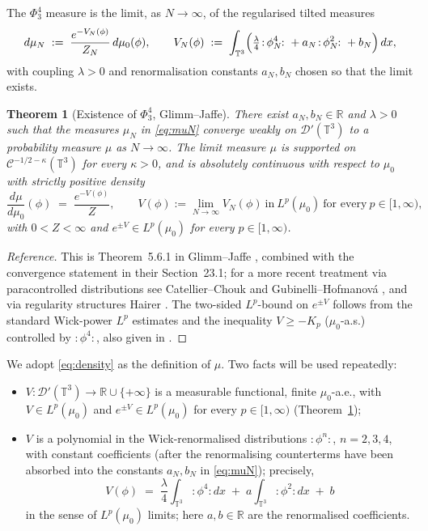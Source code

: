\documentclass[12pt]{article}
\newtheorem{theorem}{Theorem}
\theoremstyle{definition}
\begin{document}
The $\Phi^4_3$ measure is the limit, as $N\to\infty$, of the regularised tilted measures
\begin{equation}\label{eq:muN}
d\mu_N \;:=\; \frac{e^{-V_N(\phi)}}{Z_N}\,d\mu_0(\phi),\qquad
V_N(\phi) \;:=\; \int_{\mathbb{T}^3}\Bigl(\tfrac{\lambda}{4}\colon\!\phi_N^4\!\colon
+ a_N\colon\!\phi_N^2\!\colon + b_N\Bigr)\,dx,
\end{equation}
with coupling $\lambda>0$ and renormalisation constants $a_N,b_N$ chosen so that the
limit exists.

\begin{theorem}[Existence of $\Phi^4_3$, Glimm--Jaffe]\label{thm:GJ}
There exist $a_N,b_N\in\mathbb{R}$ and $\lambda>0$ such that the measures $\mu_N$ in
\eqref{eq:muN} converge weakly on $\mathcal{D}'(\mathbb{T}^3)$ to a probability measure
$\mu$ as $N\to\infty$. The limit measure $\mu$ is supported on
$\mathcal{C}^{-1/2-\kappa}(\mathbb{T}^3)$ for every $\kappa>0$, and is absolutely continuous
with respect to $\mu_0$ with strictly positive density
\begin{equation}\label{eq:density}
\frac{d\mu}{d\mu_0}(\phi) \;=\; \frac{e^{-V(\phi)}}{Z},\qquad
V(\phi) := \lim_{N\to\infty} V_N(\phi)\ \text{in}\ L^p(\mu_0)\ \text{for every}\ p\in[1,\infty),
\end{equation}
with $0<Z<\infty$ and $e^{\pm V}\in L^p(\mu_0)$ for every $p\in[1,\infty)$.
\end{theorem}

\begin{proof}[Reference]
This is Theorem~5.6.1 in Glimm--Jaffe \cite{GlimmJaffe}, combined with the convergence
statement in their Section~23.1; for a more recent treatment via paracontrolled
distributions see Catellier--Chouk \cite{CatellierChouk} and Gubinelli--Hofmanov\'a
\cite{GH}, and via regularity structures Hairer \cite{HairerRS}. The two-sided
$L^p$-bound on $e^{\pm V}$ follows from the standard Wick-power $L^p$ estimates and the
inequality $V\ge -K_p$ ($\mu_0$-a.s.) controlled by $\colon\!\phi^4\!\colon$, also given in
\cite[Ch.~8]{GlimmJaffe}.
\end{proof}

We adopt \eqref{eq:density} as the definition of $\mu$. Two facts will be used repeatedly:
\begin{itemize}
\item[(F1)] $V:\mathcal{D}'(\mathbb{T}^3)\to\mathbb{R}\cup\{+\infty\}$ is a measurable
functional, finite $\mu_0$-a.e., with $V\in L^p(\mu_0)$ and $e^{\pm V}\in L^p(\mu_0)$ for
every $p\in[1,\infty)$ (Theorem~\ref{thm:GJ});
\item[(F2)] $V$ is a polynomial in the Wick-renormalised distributions
$\colon\!\phi^n\!\colon$, $n=2,3,4$, with constant coefficients (after the renormalising
counterterms have been absorbed into the constants $a_N,b_N$ in \eqref{eq:muN}); precisely,
\begin{equation}\label{eq:V}
V(\phi) \;=\; \frac{\lambda}{4}\int_{\mathbb{T}^3}\!\colon\!\phi^4\!\colon dx
\;+\; a\int_{\mathbb{T}^3}\!\colon\!\phi^2\!\colon dx \;+\; b
\end{equation}
in the sense of $L^p(\mu_0)$ limits; here $a,b\in\mathbb{R}$ are the renormalised
coefficients.
\end{itemize}
\end{document}
